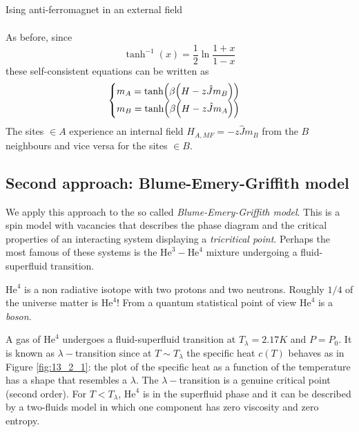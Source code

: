 \documentclass[../main/main.tex]{subfiles}
\begin{document}
\begin{example}{Ising anti-ferromagnet in an external field}{}
\begin{itemize}
\begin{subequations}
\begin{align*}
\end{align*}
\end{subequations}
As before, since
\begin{equation*}
  \tanh^{-1} (x) = \frac{1}{2} \ln{\frac{1+x}{1-x}}
\end{equation*}
these self-consistent equations can be written as
\begin{equation}
  \begin{cases}
   m_A = \tanh ( \beta \qty(H - z \hat{J} m_B ) )\\
   m_B = \tanh ( \beta \qty(H - z \hat{J} m_A ) )
  \end{cases}
\end{equation}
The sites \( \in A \) experience an internal field \( H_{A,MF} = - z \hat{J} m_B \) from the \( B \) neighbours and vice versa for the sites \( \in B \).
\end{itemize}
\end{example}

\subsection{Second approach: Blume-Emery-Griffith model}
We apply this approach to the so called \emph{Blume-Emery-Griffith model}.
This is a spin model with vacancies that describes the phase diagram and the critical properties of an interacting system displaying a \emph{tricritical point}. Perhaps the most famous of these systems is the \( \text{He}^3-\text{He}^4 \) mixture undergoing a fluid-superfluid transition.

\begin{remark}
\( \text{He}^4 \)  is a non radiative isotope with two protons and two neutrons. Roughly \( 1/4 \) of the universe matter is \( \text{He}^4 \)!
From a quantum statistical point of view \( \text{He}^4 \) is a \emph{boson}.
\end{remark}

 A gas of \( \text{He}^4 \) undergoes a fluid-superfluid transition at \( T_ \lambda =2.17 K \) and \( P=P_0 \). It is known as \( \lambda - \)transition since at \( T \sim T_ \lambda  \)  the specific heat \( c(T) \) behaves as in Figure \ref{fig:13_2_1}: the plot of the specific heat as a function of the temperature has a shape that resembles a \(\lambda\). 
The \( \lambda - \)transition is a genuine critical point (second order). For \( T < T_{\lambda } \), \( \text{He}^4 \)  is in the superfluid phase and it can be described by a two-fluids model in which one component has zero viscosity and zero entropy.
\end{document}
